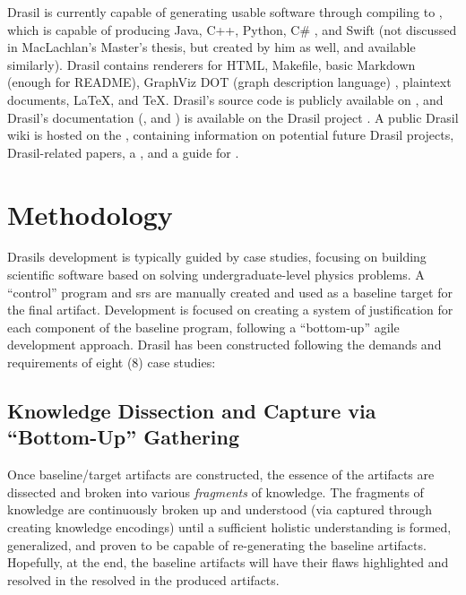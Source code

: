 Drasil is currently capable of generating usable software through compiling to
, which is capable of producing Java, C++, Python, C\#
\cite{MacLachlan2020}, and Swift (not discussed in MacLachlan's Master's thesis,
but created by him as well, and available similarly). Drasil contains renderers
for HTML, Makefile, basic Markdown (enough for README), GraphViz DOT (graph
description language) \cite{Gansner1993}, plaintext documents, \LaTeX{}, and
\TeX{}. Drasil's source code is publicly available on
, and Drasil's
documentation
(,
and
)
is available on the Drasil project
. A public Drasil
wiki is hosted on the , containing information
on potential future Drasil projects, Drasil-related papers, a
, and a
guide for .

\section{Methodology}

Drasils development is typically guided by case studies, focusing on building
scientific software based on solving undergraduate-level physics problems. A
``control'' program and \acs{srs} are manually created and used as a baseline
target for the final artifact. Development is focused on creating a system of
justification for each component of the baseline program, following a
``bottom-up'' agile 
development approach. Drasil has been constructed following the demands and
requirements of eight (8) case studies:

\caseStudiesTable

\subsection{Knowledge Dissection and Capture via ``Bottom-Up'' Gathering}

Once baseline/target artifacts are constructed, the essence of the artifacts are
dissected and broken into various \textit{fragments} of knowledge. The fragments
of knowledge are continuously broken up and understood (via captured through
creating knowledge encodings) until a sufficient holistic understanding is
formed, generalized, and proven to be capable of re-generating the baseline
artifacts. Hopefully, at the end, the baseline artifacts will have their flaws
highlighted and resolved in the resolved in the produced artifacts.

